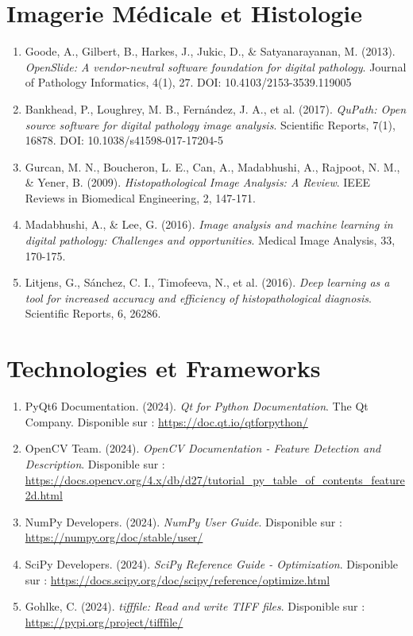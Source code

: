 \documentclass[12pt,a4paper]{report}
\begin{document}
\section{Imagerie Médicale et Histologie}

\begin{enumerate}
\item Goode, A., Gilbert, B., Harkes, J., Jukic, D., \& Satyanarayanan, M. (2013). \textit{OpenSlide: A vendor-neutral software foundation for digital pathology}. Journal of Pathology Informatics, 4(1), 27. DOI: 10.4103/2153-3539.119005

\item Bankhead, P., Loughrey, M. B., Fernández, J. A., et al. (2017). \textit{QuPath: Open source software for digital pathology image analysis}. Scientific Reports, 7(1), 16878. DOI: 10.1038/s41598-017-17204-5

\item Gurcan, M. N., Boucheron, L. E., Can, A., Madabhushi, A., Rajpoot, N. M., \& Yener, B. (2009). \textit{Histopathological Image Analysis: A Review}. IEEE Reviews in Biomedical Engineering, 2, 147-171.

\item Madabhushi, A., \& Lee, G. (2016). \textit{Image analysis and machine learning in digital pathology: Challenges and opportunities}. Medical Image Analysis, 33, 170-175.

\item Litjens, G., Sánchez, C. I., Timofeeva, N., et al. (2016). \textit{Deep learning as a tool for increased accuracy and efficiency of histopathological diagnosis}. Scientific Reports, 6, 26286.
\end{enumerate}

\section{Technologies et Frameworks}

\begin{enumerate}
\item PyQt6 Documentation. (2024). \textit{Qt for Python Documentation}. The Qt Company. Disponible sur : \url{https://doc.qt.io/qtforpython/}

\item OpenCV Team. (2024). \textit{OpenCV Documentation - Feature Detection and Description}. Disponible sur : \url{https://docs.opencv.org/4.x/db/d27/tutorial_py_table_of_contents_feature2d.html}

\item NumPy Developers. (2024). \textit{NumPy User Guide}. Disponible sur : \url{https://numpy.org/doc/stable/user/}

\item SciPy Developers. (2024). \textit{SciPy Reference Guide - Optimization}. Disponible sur : \url{https://docs.scipy.org/doc/scipy/reference/optimize.html}

\item Gohlke, C. (2024). \textit{tifffile: Read and write TIFF files}. Disponible sur : \url{https://pypi.org/project/tifffile/}
\end{enumerate}
\end{document}
